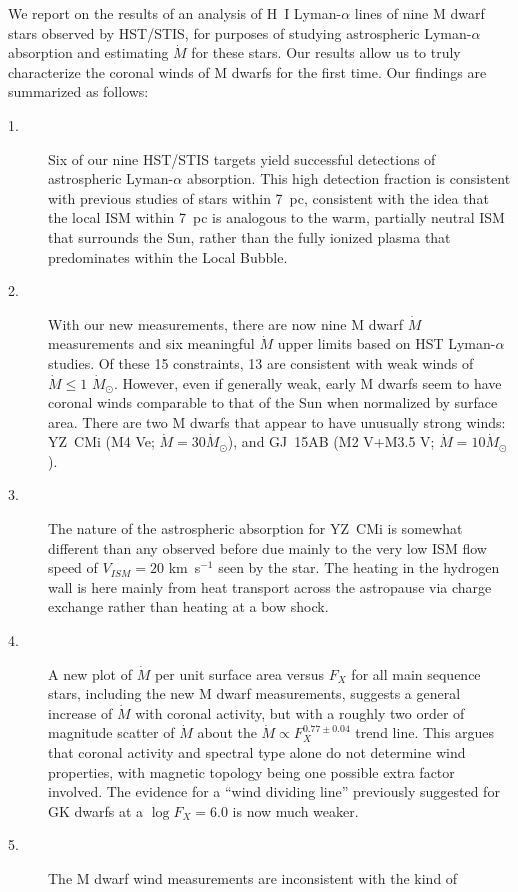 \documentclass[preprint]{aastex}
\begin{document}
     We report on the results of an analysis of H~I Lyman-$\alpha$ lines of
nine M dwarf stars observed by HST/STIS, for purposes of studying
astrospheric Lyman-$\alpha$ absorption and estimating $\dot{M}$ for
these stars.  Our results allow us to truly characterize the coronal
winds of M dwarfs for the first time.  Our findings are summarized as
follows:
\begin{description}
\item[1.] Six of our nine HST/STIS targets yield successful detections
  of astrospheric Lyman-$\alpha$ absorption.
  This high detection fraction is consistent with previous
  studies of stars within 7~pc, consistent with the idea that the local
  ISM within 7~pc is analogous to the warm, partially
  neutral ISM that surrounds the Sun, rather than the fully ionized
  plasma that predominates within the Local Bubble.
\item[2.] With our new measurements, there are now nine M dwarf $\dot{M}$
  measurements and six meaningful $\dot{M}$ upper limits based on
  HST Lyman-$\alpha$ studies.  Of these 15 constraints, 13 are consistent
  with weak winds of $\dot{M}\leq 1$ $\dot{M}_{\odot}$.  However, even if
  generally weak, early M dwarfs seem to have
  coronal winds comparable to that of the Sun when normalized by surface
  area.  There are two M dwarfs that
  appear to have unusually strong winds:  YZ~CMi
  (M4 Ve; $\dot{M}=30 \dot{M}_{\odot}$), and GJ~15AB (M2 V+M3.5 V;
  $\dot{M}=10 \dot{M}_{\odot}$).
\item[3.] The nature of the astrospheric absorption for YZ~CMi is
  somewhat different than any observed before due mainly to the very low
  ISM flow speed of $V_{ISM}=20$ km~s$^{-1}$ seen by the star.  The
  heating in the hydrogen wall is here mainly from heat transport across
  the astropause via charge exchange rather than heating at a bow shock.
\item[4.] A new plot of $\dot{M}$ per unit surface area versus $F_X$
  for all main sequence stars, including the new M dwarf measurements,
  suggests a general increase of $\dot{M}$ with coronal activity, but
  with a roughly two order of magnitude scatter of $\dot{M}$ about
  the $\dot{M}\propto F_X^{0.77\pm 0.04}$ trend line.
  This argues that coronal activity and spectral
  type alone do not determine wind properties, with magnetic topology
  being one possible extra factor involved.  The evidence for a
  ``wind dividing line'' previously suggested for GK dwarfs at a
  $\log F_X=6.0$ is now much weaker.
\item[5.] The M dwarf wind measurements are inconsistent with the kind of

\end{description}
\end{document}
